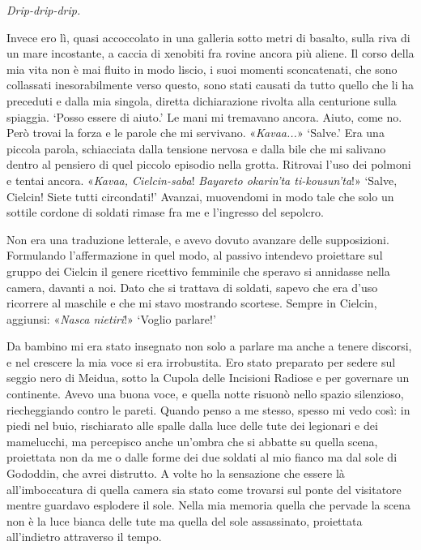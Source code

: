 \emph{Drip-drip-drip.}

Invece ero lì, quasi accoccolato in una galleria sotto metri di basalto,
sulla riva di un mare incostante, a caccia di xenobiti fra rovine ancora
più aliene. Il corso della mia vita non è mai fluito in modo liscio, i
suoi momenti sconcatenati, che sono collassati inesorabilmente verso
questo, sono stati causati da tutto quello che li ha preceduti e dalla
mia singola, diretta dichiarazione rivolta alla centurione sulla
spiaggia. `Posso essere di aiuto.' Le mani mi tremavano ancora. Aiuto,
come no. Però trovai la forza e le parole che mi servivano.
«\emph{Kavaa...}» `Salve.' Era una piccola parola, schiacciata dalla
tensione nervosa e dalla bile che mi salivano dentro al pensiero di quel
piccolo episodio nella grotta. Ritrovai l'uso dei polmoni e tentai
ancora. «\emph{Kavaa, Cielcin-saba}! \emph{Bayareto okarin'ta
	ti-kousun'ta}!» `Salve, Cielcin! Siete tutti circondati!' Avanzai,
muovendomi in modo tale che solo un sottile cordone di soldati rimase
fra me e l'ingresso del sepolcro.

Non era una traduzione letterale, e avevo dovuto avanzare delle
supposizioni. Formulando l'affermazione in quel modo, al passivo
intendevo proiettare sul gruppo dei Cielcin il genere ricettivo
femminile che speravo si annidasse nella camera, davanti a noi. Dato che
si trattava di soldati, sapevo che era d'uso ricorrere al maschile e che
mi stavo mostrando scortese. Sempre in Cielcin, aggiunsi: «\emph{Nasca
	nietiri}!» `Voglio parlare!'

Da bambino mi era stato insegnato non solo a parlare ma anche a tenere
discorsi, e nel crescere la mia voce si era irrobustita. Ero stato
preparato per sedere sul seggio nero di Meidua, sotto la Cupola delle
Incisioni Radiose e per governare un continente. Avevo una buona voce, e
quella notte risuonò nello spazio silenzioso, riecheggiando contro le
pareti. Quando penso a me stesso, spesso mi vedo così: in piedi nel
buio, rischiarato alle spalle dalla luce delle tute dei legionari e dei
mamelucchi, ma percepisco anche un'ombra che si abbatte su quella scena,
proiettata non da me o dalle forme dei due soldati al mio fianco ma dal
sole di Gododdin, che avrei distrutto. A volte ho la sensazione che
essere là all'imboccatura di quella camera sia stato come trovarsi sul
ponte del visitatore mentre guardavo esplodere il sole. Nella mia
memoria quella che pervade la scena non è la luce bianca delle tute ma
quella del sole assassinato, proiettata all'indietro attraverso il
tempo.

